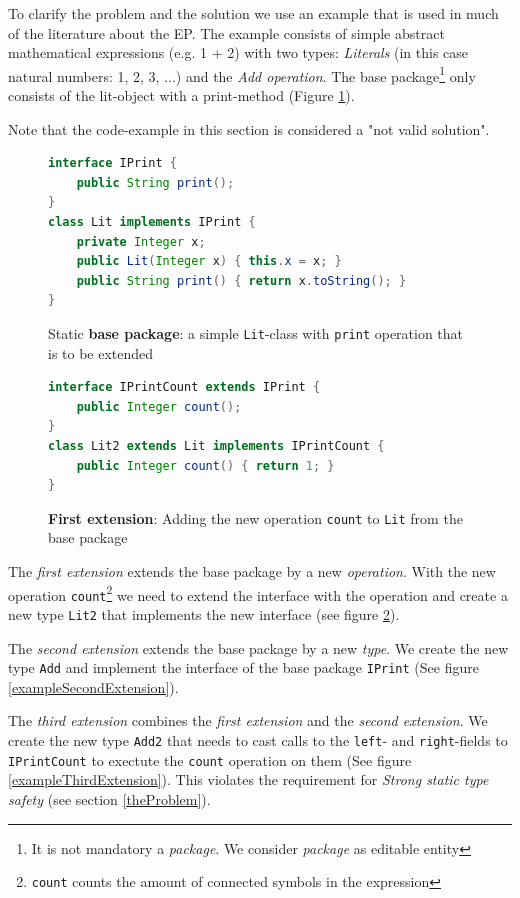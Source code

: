 \documentclass{report}
\begin{document}
To clarify the problem and the solution we use an example that is used in much of the literature about the EP. The example consists of simple abstract mathematical expressions (e.g. 1 + 2) with two types: \emph{Literals} (in this case natural numbers: 1, 2, 3, ...) and the \emph{Add operation}. The base package\footnote{It is not mandatory a \emph{package}. We consider \emph{package} as editable entity} only consists of the lit-object with a print-method (Figure \ref{exampleLitBaseClass}).

Note that the code-example in this section is considered a "not valid solution".


\begin{figure}[H]
\begin{lstlisting}[language=java]
interface IPrint {
    public String print();
}
class Lit implements IPrint {
    private Integer x;
    public Lit(Integer x) { this.x = x; }
    public String print() { return x.toString(); }
}
\end{lstlisting}
\caption{Static \textbf{base package}: a simple \lstinline{Lit}-class with \lstinline{print} operation that is to be extended}
\label{exampleLitBaseClass}
\end{figure}
\begin{figure}[H]
\begin{lstlisting}[language=java]
interface IPrintCount extends IPrint {
    public Integer count();
}
class Lit2 extends Lit implements IPrintCount {
    public Integer count() { return 1; }
}
\end{lstlisting}
\caption{\textbf{First extension}: Adding the new operation \lstinline{count} to \lstinline{Lit} from the base package}
\label{exampleFirstExtension}
\end{figure}

The \emph{first extension} extends the base package by a new \emph{operation}. With the new operation \lstinline{count}\footnote{\lstinline{count} counts the amount of connected symbols in the expression} we need to extend the interface with the operation and create a new type \lstinline{Lit2} that implements the new interface (see figure \ref{exampleFirstExtension}).

The \emph{second extension} extends the base package by a new \emph{type}. We create the new type \lstinline{Add} and implement the interface of the base package \lstinline{IPrint} (See figure \ref{exampleSecondExtension}).

The \emph{third extension} combines the \emph{first extension} and the \emph{second extension}. We create the new type \lstinline{Add2} that needs to cast calls to the \lstinline{left}- and \lstinline{right}-fields to \lstinline{IPrintCount} to exectute the \lstinline{count} operation on them (See figure \ref{exampleThirdExtension}). This violates the requirement for \emph{Strong static type safety} (see section \ref{theProblem}).
\end{document}
